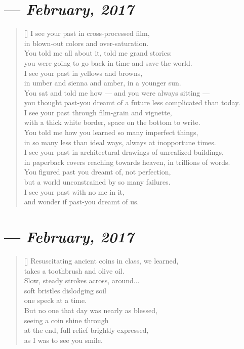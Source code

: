 \section{--- \textit{February, 2017}}

\begin{verse}[\textwidth]
  I see your past in cross-processed film,\\
  in blown-out colors and over-saturation.\\
  \vin You told me all about it, told me grand stories:\\
  \vin you were going to go back in time and save the world.\\
  I see your past in yellows and browns,\\
  in umber and sienna and amber, in a younger sun.\\
  \vin You sat and told me how --- and you were always sitting ---\\
  \vin you thought past-you dreamt of a future less complicated than today.\\
  I see your past through film-grain and vignette,\\
  with a thick white border, space on the bottom to write.\\
  \vin You told me how you learned so many imperfect things,\\
  \vin in so many less than ideal ways, always at inopportune times.\\
  I see your past in architectural drawings of unrealized buildings,\\
  in paperback covers reaching towards heaven, in trillions of words.\\
  \vin You figured past you dreamt of, not perfection,\\
  \vin but a world unconstrained by so many failures.\\
  I see your past with no me in it,\\
  and wonder if past-you dreamt of us.
\end{verse}
\newpage

\section{--- \textit{February, 2017}}

\begin{verse}[\textwidth]
  Resuscitating ancient coins in class, we learned,\\
  takes a toothbrush and olive oil.\\
  Slow, steady strokes across, around...\\
  soft bristles dislodging soil\\
  one speck at a time.\\
  But no one that day was nearly as blessed,\\
  seeing a coin shine through\\
  at the end, full relief brightly expressed,\\
  as I was to see you smile.
\end{verse}
\newpage

